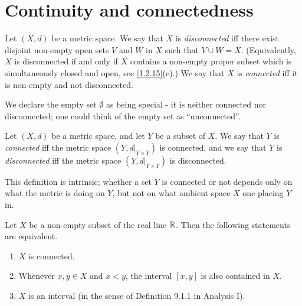 \section{Continuity and connectedness}\label{sec:2.4}

\begin{defn}\label{2.4.1}
  Let \((X, d)\) be a metric space.
  We say that \(X\) is \emph{disconnected} iff there exist disjoint non-empty open sets \(V\) and \(W\) in \(X\) such that \(V \cup W = X\).
  (Equivalently, \(X\) is disconnected if and only if \(X\) contains a non-empty proper subset which is simultaneously closed and open, see \cref{1.2.15}(e).)
  We say that \(X\) is \emph{connected} iff it is non-empty and not disconnected.
\end{defn}

\begin{note}
  We declare the empty set \(\emptyset\) as being special
  - it is neither connected nor disconnected;
  one could think of the empty set as ``unconnected''.
\end{note}

\setcounter{thm}{2}
\begin{defn}\label{2.4.3}
  Let \((X, d)\) be a metric space, and let \(Y\) be a subset of \(X\).
  We say that \(Y\) is \emph{connected} iff the metric space \((Y, d|_{Y \times Y})\) is connected, and we say that \(Y\) is \emph{disconnected} iff the metric space \((Y, d|_{Y \times Y})\) is disconnected.
\end{defn}

\begin{rmk}\label{2.4.4}
  This definition is intrinsic;
  whether a set \(Y\) is connected or not depends only on what the metric is doing on \(Y\), but not on what ambient space \(X\) one placing \(Y\) in.
\end{rmk}

\begin{thm}\label{2.4.5}
  Let \(X\) be a non-empty subset of the real line \(\mathbb{R}\).
  Then the following statements are equivalent.
  \begin{enumerate}
    \item \(X\) is connected.
    \item Whenever \(x, y \in X\) and \(x < y\), the interval \([x, y]\) is also contained in \(X\).
    \item \(X\) is an interval (in the sense of Definition 9.1.1 in Analysis I).
  \end{enumerate}
\end{thm}


